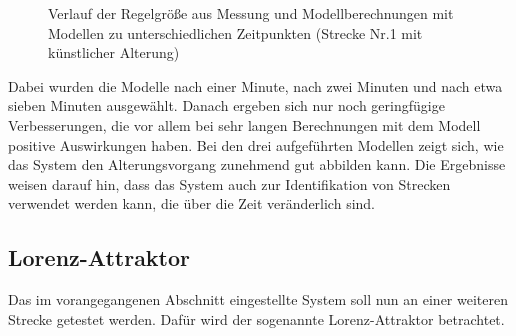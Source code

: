                 \begin{figure}[h]
                    \caption{Verlauf der Regelgröße aus Messung und Modellberechnungen mit Modellen zu unterschiedlichen Zeitpunkten (Strecke Nr.1 mit künstlicher Alterung)}
                    \label{Abb:Modelle102}
                \end{figure}
                Dabei wurden die Modelle nach einer Minute, nach zwei Minuten und nach etwa sieben Minuten ausgewählt. Danach ergeben sich nur noch geringfügige Verbesserungen, 
                die vor allem bei sehr langen Berechnungen mit dem Modell positive Auswirkungen haben. Bei den drei aufgeführten Modellen zeigt sich, wie das System den 
                Alterungsvorgang zunehmend gut abbilden kann. Die Ergebnisse weisen darauf hin, dass das System auch zur Identifikation von Strecken verwendet werden kann, 
                die über die Zeit veränderlich sind.          
                                        
        \subsection{Lorenz-Attraktor}
            Das im vorangegangenen Abschnitt eingestellte System soll nun an einer weiteren Strecke getestet werden. Dafür wird der sogenannte Lorenz-Attraktor betrachtet.
